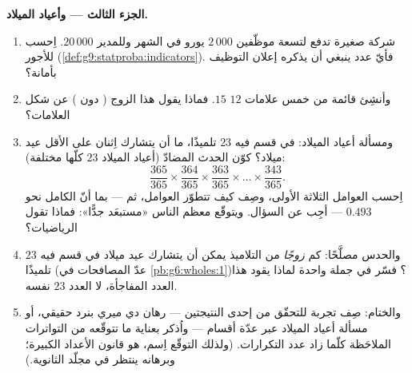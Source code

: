 \begin{problem}
\medskip
\noindent\textbf{الجزء الثالث ---   وأعياد الميلاد.}
\begin{enumerate}[resume]
  \item شركة صغيرة تدفع لتسعة موظّفين $2\,000$ يورو في الشهر
        وللمدير $20\,000$. اِحسب   للأجور
        (\cref{def:g9:statproba:indicators}). فأيّ عدد ينبغي أن
        يذكره إعلان التوظيف بأمانة؟
  \item وأنشِئ قائمة من خمس علامات  $12$
         $15$. فماذا يقول هذا الزوج ( دون
        ) عن شكل العلامات؟
  \item ومسألة أعياد الميلاد: في قسم فيه $23$ تلميذًا، ما
         أن يتشارك اِثنان على الأقل عيد ميلاد؟ كوّن
        الحدث المضادّ (أعياد الميلاد $23$ كلّها مختلفة):
        \[
        \frac{365}{365} \times \frac{364}{365} \times
        \frac{363}{365} \times \dots \times \frac{343}{365} .
        \]
        اِحسب  العوامل الثلاثة الأولى، وصِف كيف تتطوّر
        العوامل، ثم --- بما أنّ  الكامل نحو $0.493$ ---
        أجِب عن السؤال. ويتوقّع معظم الناس «مستبعَد جدًّا»:
        فماذا تقول الرياضيات؟
  \item والحدس مصلَّحًا: كم \emph{زوجًا} من التلاميذ يمكن أن
        يتشارك عيد ميلاد في قسم فيه $23$ تلميذًا (عدّ
        المصافحات في \cref{pb:g6:wholes:1})؟ فسّر في جملة واحدة
        لماذا يقود هذا العدد المفاجأة، لا العدد $23$ نفسه.
  \item والختام: صِف تجربة للتحقّق من إحدى النتيجتين --- رهان
        دي ميري بنرد حقيقي، أو مسألة أعياد الميلاد عبر عدّة
        أقسام --- واُذكر بعناية ما تتوقّعه من التواترات
        الملاحَظة كلّما زاد عدد التكرارات. (ولذلك التوقّع
        اِسم، هو قانون الأعداد الكبيرة؛ وبرهانه ينتظر في مجلّد
        الثانوية.)
\end{enumerate}
\end{problem}

